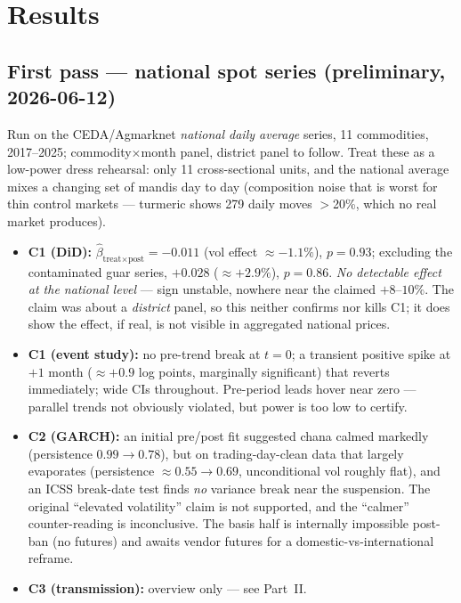 \documentclass[11pt]{article}
\begin{document}
\section{Results}
\subsection{First pass --- national spot series (preliminary, 2026-06-12)}
Run on the CEDA/Agmarknet \emph{national daily average} series, 11 commodities,
2017--2025; commodity$\times$month panel, district panel to follow. Treat these as a
low-power dress rehearsal: only 11 cross-sectional units, and the national average mixes
a changing set of mandis day to day (composition noise that is worst for thin control
markets --- turmeric shows 279 daily moves $>$20\%, which no real market produces).
\begin{itemize}[leftmargin=1.6em]
  \item \textbf{C1 (DiD):} $\hat\beta_{\text{treat}\times\text{post}} = -0.011$
        (vol effect $\approx -1.1\%$), $p=0.93$; excluding the contaminated guar series,
        $+0.028$ ($\approx +2.9\%$), $p=0.86$. \emph{No detectable effect at the national
        level} --- sign unstable, nowhere near the claimed $+8$--$10\%$. The claim was
        about a \emph{district} panel, so this neither confirms nor kills C1; it does show
        the effect, if real, is not visible in aggregated national prices.
  \item \textbf{C1 (event study):} no pre-trend break at $t=0$; a transient positive
        spike at $+1$ month ($\approx+0.9$ log points, marginally significant) that
        reverts immediately; wide CIs throughout. Pre-period leads hover near zero ---
        parallel trends not obviously violated, but power is too low to certify.
  \item \textbf{C2 (GARCH):} an initial pre/post fit suggested chana calmed markedly
        (persistence $0.99\to0.78$), but on trading-day-clean data that largely
        evaporates (persistence $\approx 0.55\to0.69$, unconditional vol roughly flat),
        and an ICSS break-date test finds \emph{no} variance break near the suspension.
        The original ``elevated volatility'' claim is not supported, and the ``calmer''
        counter-reading is inconclusive. The basis half is internally impossible post-ban
        (no futures) and awaits vendor futures for a domestic-vs-international reframe.
  \item \textbf{C3 (transmission):} overview only --- see Part~II.
\end{itemize}
\end{document}
